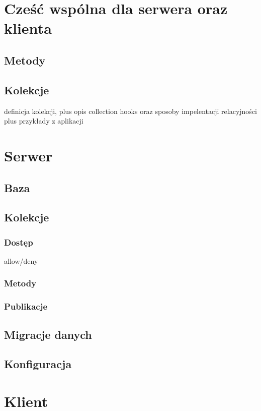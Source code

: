 \section{Cześć wspólna dla serwera oraz klienta}
  \subsection{Metody}
  \subsection{Kolekcje} 
    definicja kolekcji, plus opis collection hooks oraz sposoby impelentacji relacyjności plus przykłady z aplikacji
    
    
\section{Serwer}
  \subsection{Baza}
  \subsection{Kolekcje}
  \subsubsection{Dostęp}
   allow/deny
   \subsubsection{Metody}
   \subsubsection{Publikacje}
  \subsection{Migracje danych}
  \subsection{Konfiguracja}



\section{Klient}
